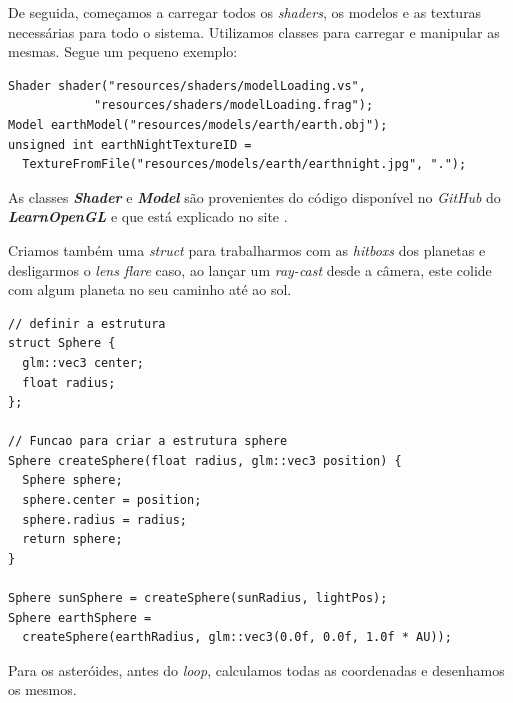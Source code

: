 \noindent
De seguida, começamos a carregar todos os \textit{shaders}, os modelos e as texturas necessárias para todo o sistema. Utilizamos classes para carregar e manipular as mesmas.
Segue um pequeno exemplo:

\newpage

\begin{lstlisting}[style=Cpp, caption=Carregamento das \textit{shaders}{,} modelos e texturas]
Shader shader("resources/shaders/modelLoading.vs",
            "resources/shaders/modelLoading.frag");
Model earthModel("resources/models/earth/earth.obj");
unsigned int earthNightTextureID =
  TextureFromFile("resources/models/earth/earthnight.jpg", ".");
\end{lstlisting}

\noindent
As classes \textbf{\textit{Shader}} e \textbf{ \textit{Model}} são provenientes do código disponível no \textit{GitHub} do \textbf{\textit{LearnOpenGL}} \cite{lopglgithub} e que está explicado no site \cite{lopgl}.

\noindent
Criamos também uma \textit{struct} para trabalharmos com as \textit{hitboxs} dos planetas e desligarmos o \textit{lens flare} caso, ao lançar um \textit{ray-cast} desde a câmera, este colide com algum planeta no seu caminho até ao sol.

\begin{lstlisting}[style=Cpp, caption=Colisões parte 1]
// definir a estrutura
struct Sphere {
  glm::vec3 center;
  float radius;
};

// Funcao para criar a estrutura sphere
Sphere createSphere(float radius, glm::vec3 position) {
  Sphere sphere;
  sphere.center = position;
  sphere.radius = radius;
  return sphere;
}

Sphere sunSphere = createSphere(sunRadius, lightPos);
Sphere earthSphere =
  createSphere(earthRadius, glm::vec3(0.0f, 0.0f, 1.0f * AU));
\end{lstlisting}

\noindent
Para os asteróides, antes do \textit{loop}, calculamos todas as coordenadas e desenhamos os mesmos. 

